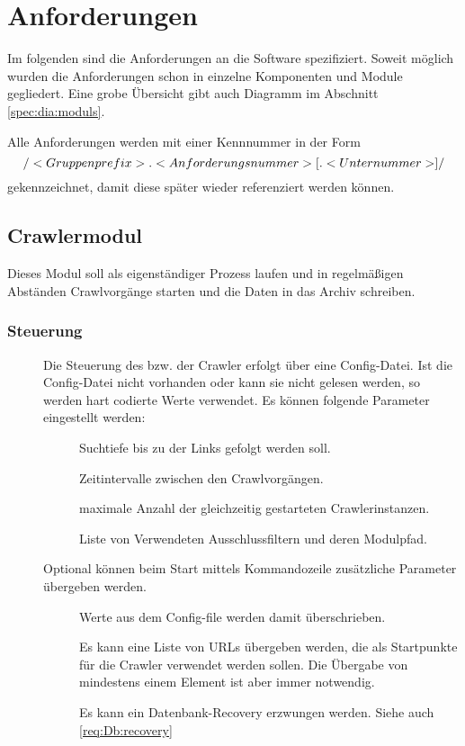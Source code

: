 \chapter{Anforderungen}
Im folgenden sind die Anforderungen an die Software spezifiziert. Soweit möglich wurden
die Anforderungen schon in einzelne Komponenten und Module gegliedert. Eine grobe Übersicht gibt auch Diagramm
im Abschnitt \ref{spec:dia:moduls}.

Alle Anforderungen werden mit einer Kennnummer in der Form 
\[ \text{/}<Gruppenprefix> . <Anforderungsnummer> [. <Unternummer> ]\text{/} \]
gekennzeichnet, damit diese später wieder referenziert werden können.

\section{Crawlermodul}
Dieses Modul soll als eigenständiger Prozess laufen und in regelmäßigen Abständen Crawlvorgänge starten
und die Daten in das Archiv schreiben.

\subsection{Steuerung}
\begin{description}
	\item []
		Die Steuerung des bzw. der Crawler erfolgt über eine Config-Datei.
		Ist die Config-Datei nicht vorhanden oder kann sie nicht gelesen werden,
        so werden hart codierte Werte verwendet.
		Es können folgende Parameter eingestellt werden:
		\begin{description}
			\item []
				Suchtiefe bis zu der Links gefolgt werden soll.
			\item []
				Zeitintervalle zwischen den Crawlvorgängen.
			\item []
				maximale Anzahl der gleichzeitig gestarteten Crawlerinstanzen.
			\item []
				Liste von Verwendeten Ausschlussfiltern und deren Modulpfad.
		\end{description}
	\item []
		Optional können beim Start mittels Kommandozeile zusätzliche Parameter übergeben werden.
		\begin{description}
			\item []
				Werte aus dem Config-file werden damit überschrieben.
			\item []
				Es kann eine Liste von URLs übergeben werden, 
				die als Startpunkte für die Crawler verwendet werden sollen.
				Die Übergabe von mindestens einem Element ist aber immer notwendig.
			\item []
				Es kann ein Datenbank-Recovery erzwungen werden. Siehe auch \ref{req:Db:recovery}
		\end{description}
\end{description}

